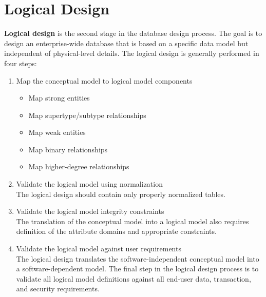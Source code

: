 \documentclass[a4paper, 12pt, titlepage]{report}
\begin{document}
\section{Logical Design}
\textbf{Logical design} is the second stage in the database design process. The goal is to design an enterprise-wide database that is based on a specific data model but independent of physical-level details. The logical design is generally performed in four steps:
\begin{enumerate}
\item Map the conceptual model to logical model components
\begin{itemize}
\item Map strong entities
\item Map supertype/subtype relationships
\item Map weak entities
\item Map binary relationships
\item Map higher-degree relationships
\end{itemize}
\item Validate the logical model using normalization
\\ The logical design should contain only properly normalized tables.
\item Validate the logical model integrity constraints
\\ The translation of the conceptual model into a logical model also requires definition of the attribute domains and appropriate constraints.
\item Validate the logical model against user requirements
\\ The logical design translates the software-independent conceptual model into a software-dependent model. The final step in the logical design process is to validate all logical model definitions against all end-user data, transaction, and security requirements. 
\end{enumerate}
\end{document}
